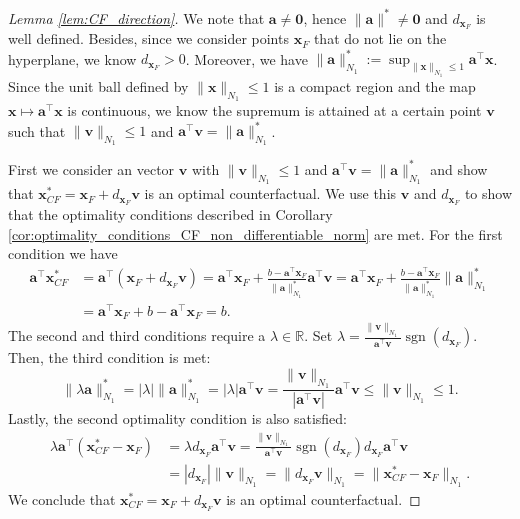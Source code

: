 \documentclass{article}
\DeclareMathOperator*{\sgn}{sgn}
\begin{document}
{\begin{proof}[Lemma \ref{lem:CF_direction}]
    We note that $\bm{a}\neq\bm{0}$, hence $\|\bm{a}\|^*\neq\bm{0}$ and $d_{\bm{x}_F}$ is well defined. Besides, since we consider points $\bm{x}_F$ that do not lie on the hyperplane, we know $d_{\bm{x}_F}>0$. Moreover, we have $\|\bm{a}\|_{N_1}^*:=\sup_{\|\bm{x}\|_{N_1}\leq 1}\bm{a}^{\top}\bm{x}$. Since the unit ball defined by $\|\bm{x}\|_{N_1}\leq 1$ is a compact region and the map $\bm{x} \mapsto \bm{a}^{\top}\bm{x}$ is continuous, we know the supremum is attained at a certain point $\bm{v}$ such that $\|\bm{v}\|_{N_1}\leq 1$ and $\bm{a}^{\top}\bm{v}=\|\bm{a}\|_{N_1}^*$.

    First we consider an vector $\bm{v}$ with $\|\bm{v}\|_{N_1}\leq 1$ and $\bm{a}^{\top}\bm{v}=\|\bm{a}\|_{N_1}^*$ and show that $\bm{x}_{CF}^*= \bm{x}_{F}+d_{\bm{x}_F}\bm{v}$ is an optimal counterfactual.
    We use this $\bm{v}$ and $d_{\bm{x}_F}$ to show that the optimality conditions described in Corollary \ref{cor:optimality_conditions_CF_non_differentiable_norm} are met. For the first condition we have
    \begin{align*}
        \bm{a}^\top \bm{x}_{CF}^* &= \bm{a}^\top (\bm{x}_F+d_{\bm{x}_F}\bm{v})= \bm{a}^\top\bm{x}_F +\frac{b-\bm{a}^{\top}\bm{x}_F}{\|\bm{a}\|_{N_1}^*}\bm{a}^\top\bm{v}
        = \bm{a}^\top\bm{x}_F +\frac{b-\bm{a}^{\top}\bm{x}_F}{\|\bm{a}\|_{N_1}^*}\|\bm{a}\|_{N_1}^*\\
        &= \bm{a}^\top\bm{x}_F +b-\bm{a}^{\top}\bm{x}_F=b.
    \end{align*}
    The second and third conditions require a $\lambda\in\mathbb{R}$. Set $\lambda=\frac{\|\bm{v}\|_{N_1}}{\bm{a}^{\top}\bm{v}} \sgn(d_{\bm{x}_F})$. Then, the third condition is met:
    \[ \|\lambda\bm{a}\|_{N_1}^* = |\lambda|   \|\bm{a}\|_{N_1}^* = |\lambda|   \bm{a}^{\top}\bm{v}
    = \frac{\|\bm{v}\|_{N_1}}{|\bm{a}^{\top}\bm{v}|} \bm{a}^{\top}\bm{v}\leq \|\bm{v}\|_{N_1}\leq 1.\]
    Lastly, the second optimality condition is also satisfied:
    \begin{align*}
    \lambda \bm{a}^\top (\bm{x}_{CF}^* - \bm{x}_F) &= \lambda  d_{\bm{x}_F}  \bm{a}^\top \bm{v}
    =\frac{\|\bm{v}\|_{N_1}}{\bm{a}^{\top}\bm{v}}   \sgn(d_{\bm{x}_F})   d_{\bm{x}_F}   \bm{a}^\top \bm{v}\\
    &= |d_{\bm{x}_F}|  \|\bm{v}\|_{N_1} =\|d_{\bm{x}_F}  \bm{v}\|_{N_1} =\|\bm{x}_{CF}^* - \bm{x}_F\|_{N_1} .
    \end{align*}
    We conclude that $\bm{x}_{CF}^*= \bm{x}_{F}+d_{\bm{x}_F}\bm{v}$ is an optimal counterfactual.


\end{proof}}
\end{document}
